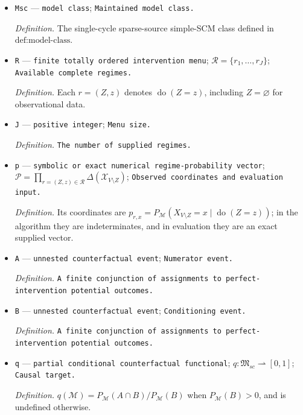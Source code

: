 \documentclass{article}
\begin{document}
\begin{itemize}
  \par\smallskip\noindent\emph{Definition.} A model with equations \(X_v=f_v(X_{\operatorname{pa}_G(v)},U_{\operatorname{inc}(v)})\) and product source law \(P_U=\bigotimes_{s\in S}P_s\).
  \item \texttt{Msc} --- \texttt{model class}; \texttt{Maintained model class.}
  \par\smallskip\noindent\emph{Definition.} The single-cycle sparse-source simple-SCM class defined in \(\text{def:model-class}\).
  \item \texttt{R} --- \texttt{finite totally ordered intervention menu}; \(\mathcal R=\{r_1,\ldots,r_J\}\); \texttt{Available complete regimes.}
  \par\smallskip\noindent\emph{Definition.} Each \(r=(Z,z)\) denotes \(\operatorname{do}(Z=z)\), including \(Z=\varnothing\) for observational data.
  \item \texttt{J} --- \texttt{positive integer}; \texttt{Menu size.}
  \par\smallskip\noindent\emph{Definition.} \texttt{The number of supplied regimes.}
  \item \texttt{p} --- \texttt{symbolic or exact numerical regime-\allowbreak{}probability vector}; \(\mathcal P=\prod_{r=(Z,z)\in\mathcal R}\Delta(\mathcal X_{V\setminus Z})\); \texttt{Observed coordinates and evaluation input.}
  \par\smallskip\noindent\emph{Definition.} Its coordinates are \(p_{r,x}=P_{\mathcal M}(X_{V\setminus Z}=x\mid\operatorname{do}(Z=z))\); in the algorithm they are indeterminates, and in evaluation they are an exact supplied vector.
  \item \texttt{A} --- \texttt{unnested counterfactual event}; \texttt{Numerator event.}
  \par\smallskip\noindent\emph{Definition.} \texttt{A finite conjunction of assignments to perfect-\allowbreak{}intervention potential outcomes.}
  \item \texttt{B} --- \texttt{unnested counterfactual event}; \texttt{Conditioning event.}
  \par\smallskip\noindent\emph{Definition.} \texttt{A finite conjunction of assignments to perfect-\allowbreak{}intervention potential outcomes.}
  \item \texttt{q} --- \texttt{partial conditional counterfactual functional}; \(q:\mathfrak M_{sc}\rightharpoonup[0,1]\); \texttt{Causal target.}
  \par\smallskip\noindent\emph{Definition.} \(q(\mathcal M)=P_{\mathcal M}(A\cap B)/P_{\mathcal M}(B)\) when \(P_{\mathcal M}(B)>0\), and is undefined otherwise.

\end{itemize}
\end{document}
